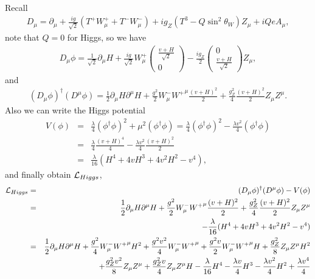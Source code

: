 \documentclass[11pt]{article}
\def\del{{\partial}}
\begin{document}
\section{ }
Recall
\begin{eqnarray}
    D_\mu = \del_\mu +\frac{ig}{\sqrt 2} (T^+ W_\mu^+ + T^-W_\mu^-)+ig_Z(T^3-Q\sin^2\theta_W)Z_\mu + iQeA_\mu,
\end{eqnarray}
note that $Q=0$ for Higgs, so we have
\begin{eqnarray}
    D_\mu \phi =\frac{1}{\sqrt 2}\del_\mu H + \frac{ig}{\sqrt 2} W_\mu^+
    \begin{pmatrix}
        \frac{v+H}{\sqrt{2}} \\ 0 
    \end{pmatrix}
    -\frac{ig_Z}{2}
    \begin{pmatrix}
        0 \\ \frac{v+H}{\sqrt{2}}
    \end{pmatrix}
    Z_\mu,
\end{eqnarray}
and
\begin{eqnarray}
    (D_\mu \phi)^\dagger (D^\mu \phi) =  \frac{1}{ 2}\del_\mu H \del^\mu H + \frac{g^2}{2}W_\mu^-{W^+}^\mu \frac{(v+H)^2}{2}+\frac{g_Z^2}{4} \frac{(v+H)^2}{2} Z_\mu Z^\mu. 
\end{eqnarray}
Also we can write the Higgs potential
\begin{eqnarray}
    V(\phi) &=& \frac{\lambda}{4} (\phi^\dagger \phi)^2 + \mu^2 (\phi^\dagger \phi) 
    =\frac{\lambda}{4} (\phi^\dagger \phi)^2 - \frac{\lambda v^2}{4}(\phi^\dagger \phi) \\
    &=& \frac{\lambda}{4} \frac{(v+H)^4}{4} - \frac{\lambda v^2}{4}\frac{(v+H)^2}{2} \\
    &=& \frac{\lambda}{16}(H^4+4vH^3+4v^2H^2-v^4),
  \end{eqnarray}
and finally obtain ${\cal L}_{Higgs}$,
\begin{eqnarray}
    {\cal L}_{Higgs} &=& (D_\mu \phi)^\dagger (D^\mu \phi) - V(\phi) \\ 
    &=& \frac{1}{2}\del_\mu H \del^\mu H + \frac{g^2}{2}W_\mu^-{W^+}^\mu \frac{(v+H)^2}{2}+\frac{g_Z^2}{4} \frac{(v+H)^2}{2} Z_\mu Z^\mu \nonumber \\ &&- \frac{\lambda}{16}(H^4+4vH^3+4v^2H^2-v^4) \\
    &=& \frac{1}{2}\del_\mu H \del^\mu H + \frac{g^2}{4}W_\mu^-{W^+}^\mu H^2 + \frac{g^2v^2}{4}W_\mu^-{W^+}^\mu +\frac{g^2v}{2}W_\mu^-{W^+}^\mu H +\frac{g_Z^2}{8}Z_\mu Z^\mu H^2 \nonumber \\ && +\frac{g_Z^2v^2}{8}Z_\mu Z^\mu +\frac{g_Z^2 v}{4}Z_\mu Z^\mu H- \frac{\lambda}{16}H^4-\frac{\lambda v}{4}H^3-\frac{\lambda v^2}{4}H^2+  \frac{\lambda v^4}{4}
\end{eqnarray}
\end{document}
